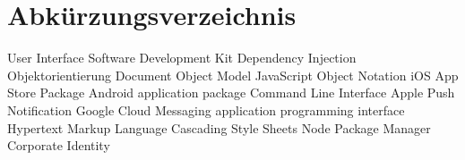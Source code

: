 
\chapter*{Abkürzungsverzeichnis}

\begin{acronym}
  {User Interface}
  {Software Development Kit}
  {Dependency Injection}
   {Objektorientierung}
   {Document Object Model}
   {JavaScript Object Notation}
   {iOS App Store Package}
   {Android application package}
   {Command Line Interface}
   {Apple Push Notification}
   {Google Cloud Messaging}
   {application programming interface}
   {Hypertext Markup Language}
   {Cascading Style Sheets}
   {Node Package Manager}
   {Corporate Identity}
\end{acronym}
